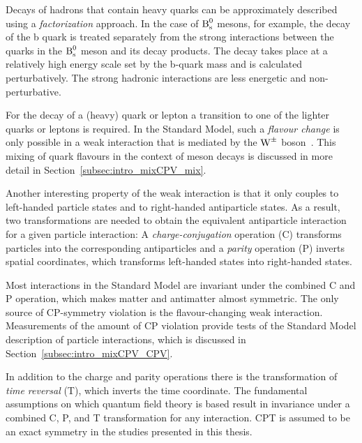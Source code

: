 Decays of hadrons that contain heavy quarks can be approximately described using a \emph{factorization} approach. In the case of $\Bs$
mesons, for example, the decay of the b quark is treated separately from the strong interactions between the quarks in the $\Bs$ meson and
its decay products. The decay takes place at a relatively high energy scale set by the b-quark mass and is calculated perturbatively. The
strong hadronic interactions are less energetic and non-perturbative.

For the decay of a (heavy) quark or lepton a transition to one of the lighter quarks or leptons is required. In the Standard Model, such a
\emph{flavour change} is only possible in a weak interaction that is mediated by the $\Wpm$
boson~\cite{Cabibbo:1963yz,Glashow:1970gm,Kobayashi:1973fv}. This mixing of quark flavours in the context of meson decays is discussed in
more detail in Section~\ref{subsec:intro_mixCPV_mix}.


Another interesting property of the weak interaction is that it only couples to left-handed particle states and to right-handed
antiparticle states. As a result, two transformations are needed to obtain the equivalent antiparticle interaction for a given particle
interaction: A \emph{charge-conjugation} operation (C) transforms particles into the corresponding antiparticles and a \emph{parity}
operation (P) inverts spatial coordinates, which transforms left-handed states into right-handed states.

Most interactions in the Standard Model are invariant under the combined C and P operation, which makes matter and antimatter almost
symmetric. The only source of CP-symmetry violation is the flavour-changing weak interaction. Measurements of the amount of CP violation
provide tests of the Standard Model description of particle interactions, which is discussed in Section~\ref{subsec:intro_mixCPV_CPV}.

In addition to the charge and parity operations there is the transformation of \emph{time reversal} (T), which inverts the time coordinate.
The fundamental assumptions on which quantum field theory is based result in invariance under a combined C, P, and T transformation for any
interaction. CPT is assumed to be an exact symmetry in the studies presented in this thesis.


